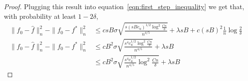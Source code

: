 \documentclass[12pt,pdftex,aos,noinfoline,addressasfootnote]{imsart}
\begin{document}
\begin{proof}

Plugging this result into equation~\eqref{eqn:first_step_inequality}
we get that, with probability at least $1 - 2\delta$,
\begin{align}
\|f_0 - \hat{f} \|_n^2 - \| f_0 - f^* \|_n^2 
   &\leq c sB \sigma \sqrt{ 
   \frac{s (sBc_u)^{1/2} \log^2 \frac{Cn}{\delta}}{n^{4/5}}}
   + \lambda s B + c (sB)^2 \frac{1}{n} \log \frac{2}{\delta} \nonumber\\
\|f_0 - \hat{f} \|_n^2 - \| f_0 - f^* \|_n^2 
   &\leq c B^2 \sigma \sqrt{ 
   \frac{s^4 c_u^{1/2} \log^2 \frac{Cn}{\delta}}{n^{4/5}}}
   + \lambda s B \nonumber\\   
   &\leq c B^2 \sigma 
    \sqrt{ \frac{s^4 c_u^{1/2}}{n^{4/5}} \log^2 \frac{Cn}{\delta}} + \lambda sB
\label{eqn:second_step_inequality}
\end{align}





\end{proof}
\end{document}
